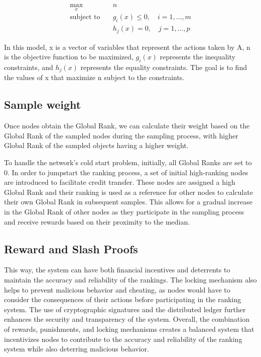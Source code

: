 \documentclass[twocolumn]{article}
\begin{document}
\begin{align}
  \max_x \quad & n \\
  \text{subject to} \quad & g_i(x) \leq 0, \quad i = 1, \dots, m \\
  & h_j(x) = 0, \quad j = 1, \dots, p
\end{align}

In this model, x is a vector of variables that represent the actions taken by A, n is the objective function to be maximized, $g_i(x)$ represents the inequality constraints, and $h_j(x)$ represents the equality constraints. The goal is to find the values of x that maximize n subject to the constraints.


\subsection{Sample weight}
Once nodes obtain the Global Rank, we can calculate their weight based on the Global Rank of the sampled nodes during the sampling process, with higher Global Rank of the sampled objects having a higher weight.

To handle the network's cold start problem, initially, all Global Ranks are set to 0. In order to jumpstart the ranking process, a set of initial high-ranking nodes are introduced to facilitate credit transfer. These nodes are assigned a high Global Rank and their ranking is used as a reference for other nodes to calculate their own Global Rank in subsequent samples. This allows for a gradual increase in the Global Rank of other nodes as they participate in the sampling process and receive rewards based on their proximity to the median.

\subsection{Reward and Slash Proofs}

This way, the system can have both financial incentives and deterrents to maintain the accuracy and reliability of the rankings. The locking mechanism also helps to prevent malicious behavior and cheating, as nodes would have to consider the consequences of their actions before participating in the ranking system. The use of cryptographic signatures and the distributed ledger further enhances the security and transparency of the system. Overall, the combination of rewards, punishments, and locking mechanisms creates a balanced system that incentivizes nodes to contribute to the accuracy and reliability of the ranking system while also deterring malicious behavior.
\end{document}
